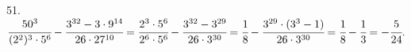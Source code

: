 51. $\cfrac{50^3}{(2^2)^3\cdot5^6}-\cfrac{3^{32}-3\cdot9^{14}}{26\cdot27^{10}}=\cfrac{2^3\cdot5^6}{2^6\cdot5^6}-\cfrac{3^{32}-3^{29}}{26\cdot3^{30}}=
\cfrac{1}{8}-\cfrac{3^{29}\cdot(3^3-1)}{26\cdot3^{30}}=\cfrac{1}{8}-\cfrac{1}{3}=-\cfrac{5}{24}.$\\
